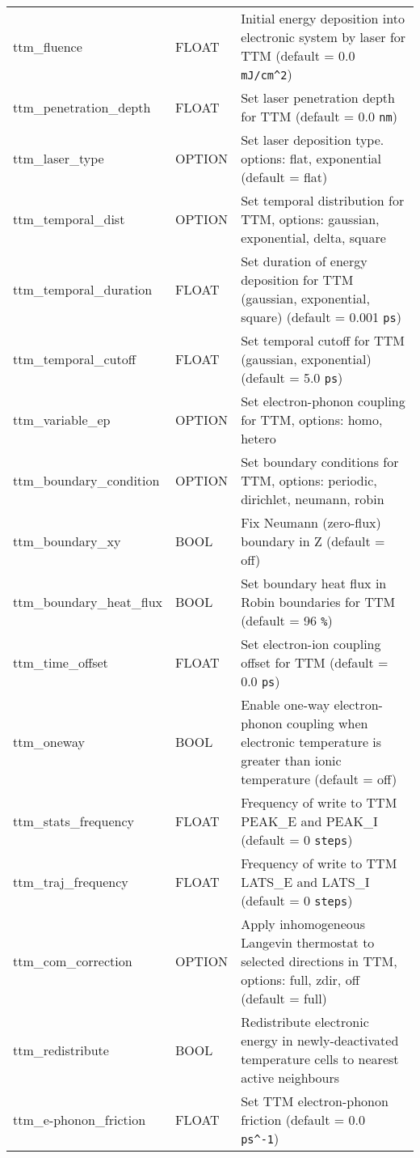 \begin{longtable}{l l p{10cm}}
ttm\_fluence & FLOAT & Initial energy deposition into electronic system by laser for TTM (default = 0.0 \verb#mJ/cm^2#) \\
ttm\_penetration\_depth & FLOAT & Set laser penetration depth for TTM (default = 0.0 \verb#nm#) \\
ttm\_laser\_type & OPTION & Set laser deposition type. options: flat, exponential (default = flat) \\
ttm\_temporal\_dist & OPTION & Set temporal distribution for TTM, options: gaussian, exponential, delta, square\\
ttm\_temporal\_duration & FLOAT & Set duration of energy deposition for TTM (gaussian, exponential, square) (default = 0.001 \verb#ps#) \\
ttm\_temporal\_cutoff & FLOAT & Set temporal cutoff for TTM (gaussian, exponential) (default = 5.0 \verb#ps#) \\
ttm\_variable\_ep & OPTION & Set electron-phonon coupling for TTM, options: homo, hetero\\
ttm\_boundary\_condition & OPTION & Set boundary conditions for TTM, options: periodic, dirichlet, neumann, robin\\
ttm\_boundary\_xy & BOOL & Fix Neumann (zero-flux) boundary in Z (default = off) \\
ttm\_boundary\_heat\_flux & BOOL & Set boundary heat flux in Robin boundaries for TTM (default = 96 \verb#%#) \\
ttm\_time\_offset & FLOAT & Set electron-ion coupling offset for TTM (default = 0.0 \verb#ps#) \\
ttm\_oneway & BOOL & Enable one-way electron-phonon coupling when electronic temperature is greater than ionic temperature (default = off) \\
ttm\_stats\_frequency & FLOAT & Frequency of write to TTM PEAK\_E and PEAK\_I (default = 0 \verb#steps#) \\
ttm\_traj\_frequency & FLOAT & Frequency of write to TTM LATS\_E and LATS\_I (default = 0 \verb#steps#) \\
ttm\_com\_correction & OPTION & Apply inhomogeneous Langevin thermostat to selected directions in TTM, options: full, zdir, off (default = full) \\
ttm\_redistribute & BOOL & Redistribute electronic energy in newly-deactivated temperature cells to nearest active neighbours\\
ttm\_e-phonon\_friction & FLOAT & Set TTM electron-phonon friction (default = 0.0 \verb#ps^-1#) \\

\end{longtable}
